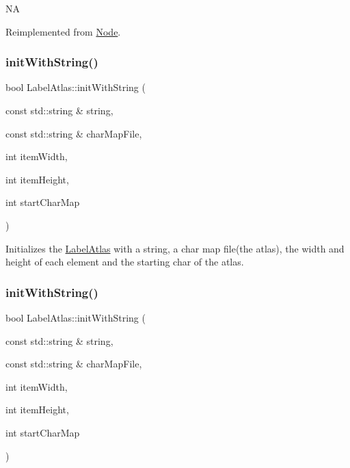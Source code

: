 NA 

Reimplemented from \hyperlink{classNode_a41710375a0d92a4ee54c39fe123b5912}{Node}.

\mbox{\label{classLabelAtlas_a69cf125f32f146c97c7d329ee935bfc0}} 
\subsubsection{\texorpdfstring{init\+With\+String()}{initWithString()}\hspace{0.1cm}{\footnotesize\ttfamily [1/6]}}
{\footnotesize\ttfamily bool Label\+Atlas\+::init\+With\+String (\begin{DoxyParamCaption}\item[{const std\+::string \&}]{string,  }\item[{const std\+::string \&}]{char\+Map\+File,  }\item[{int}]{item\+Width,  }\item[{int}]{item\+Height,  }\item[{int}]{start\+Char\+Map }\end{DoxyParamCaption})}

Initializes the \hyperlink{classLabelAtlas}{Label\+Atlas} with a string, a char map file(the atlas), the width and height of each element and the starting char of the atlas. \mbox{\label{classLabelAtlas_a69cf125f32f146c97c7d329ee935bfc0}} 
\subsubsection{\texorpdfstring{init\+With\+String()}{initWithString()}\hspace{0.1cm}{\footnotesize\ttfamily [2/6]}}
{\footnotesize\ttfamily bool Label\+Atlas\+::init\+With\+String (\begin{DoxyParamCaption}\item[{const std\+::string \&}]{string,  }\item[{const std\+::string \&}]{char\+Map\+File,  }\item[{int}]{item\+Width,  }\item[{int}]{item\+Height,  }\item[{int}]{start\+Char\+Map }\end{DoxyParamCaption})}

